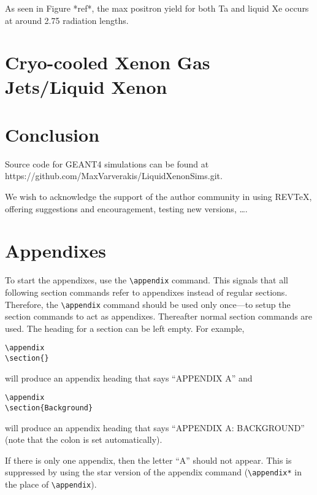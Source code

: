 \documentclass[%
reprint,
amsmath, amssymb,
aps,
]{revtex4-2}
\begin{document}
As seen in Figure *ref*, the max positron yield for both Ta and liquid Xe occurs at around 2.75 radiation lengths.

\section{Cryo-cooled Xenon Gas Jets/Liquid Xenon}

\section{Conclusion}
Source code for GEANT4 simulations can be found at https://github.com/MaxVarverakis/LiquidXenonSims.git.

\pagebreak
\begin{acknowledgments}
We wish to acknowledge the support of the author community in using
REV\TeX{}, offering suggestions and encouragement, testing new versions,
\dots.
\end{acknowledgments}

\appendix

\section{Appendixes}

To start the appendixes, use the \verb+\appendix+ command.
This signals that all following section commands refer to appendixes
instead of regular sections. Therefore, the \verb+\appendix+ command
should be used only once---to setup the section commands to act as
appendixes. Thereafter normal section commands are used. The heading
for a section can be left empty. For example,
\begin{verbatim}
\appendix
\section{}
\end{verbatim}
will produce an appendix heading that says ``APPENDIX A'' and
\begin{verbatim}
\appendix
\section{Background}
\end{verbatim}
will produce an appendix heading that says ``APPENDIX A: BACKGROUND''
(note that the colon is set automatically).

If there is only one appendix, then the letter ``A'' should not
appear. This is suppressed by using the star version of the appendix
command (\verb+\appendix*+ in the place of \verb+\appendix+).
\end{document}
